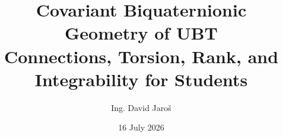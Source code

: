 \documentclass[11pt,oneside]{book}
\title{Covariant Biquaternionic Geometry of UBT\\\large Connections, Torsion, Rank, and Integrability for Students}
\author{Ing. David Jaroš}
\date{16 July 2026\\[1.2em]\UBTProvenanceTitleLine}
\theoremstyle{definition}\newtheorem{definition}{Definition}[chapter]
\theoremstyle{plain}\newtheorem{theorem}[definition]{Theorem}
\theoremstyle{remark}\newtheorem{remark}[definition]{Remark}
\begin{document}
\maketitle
\UBTProvenanceNotice
\tableofcontents

\end{document}
